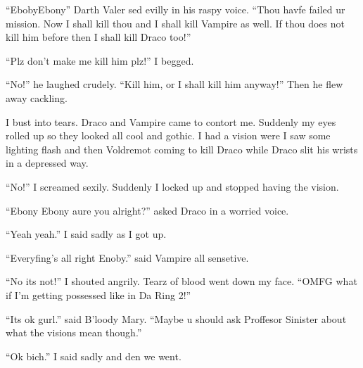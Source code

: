 \enquote{Eboby\dotfill Ebony\dotfill} Darth Valer sed evilly in his raspy voice. \enquote{Thou havfe failed ur mission. Now I shall kill thou and I shall kill Vampire as well. If thou does not kill him before then I shall kill Draco too!}

\enquote{Plz don't make me kill him plz!} I begged.

\enquote{No!} he laughed crudely. \enquote{Kill him, or I shall kill him anyway!} Then he flew away cackling.

I bust into tears. Draco and Vampire came to contort me. Suddenly my eyes rolled up so they looked all cool and gothic. I had a vision were I saw some lighting flash and then Voldremot coming to kill Draco while Draco slit his wrists in a depressed way.

\enquote{No!} I screamed sexily. Suddenly I locked up and stopped having the vision.

\enquote{Ebony Ebony aure you alright?} asked Draco in a worried voice.

\enquote{Yeah yeah.} I said sadly as I got up.

\enquote{Everyfing's all right Enoby.} said Vampire all sensetive.

\enquote{No its not!} I shouted angrily. Tearz of blood went down my face. \enquote{OMFG what if I'm getting possessed like in Da Ring 2!}

\enquote{Its ok gurl.} said B'loody Mary. \enquote{Maybe u should ask Proffesor Sinister about what the visions mean though.}

\enquote{Ok bich.} I said sadly and den we went.

